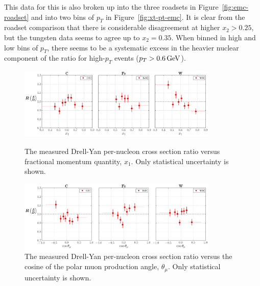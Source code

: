 This data for this is also broken up into the three roadsets in Figure~\ref{fig:emc-roadset} and into two bins of $p_T$ in Figure~\ref{fig:xt-pt-emc}. It is clear from the roadset comparison that there is considerable disagreement at higher $x_2>0.25$, but the tungsten data seems to agree up to $x_2=0.35$. When binned in high and low bins of $p_T$, there seems to be a systematic excess in the heavier nuclear component of the ratio for high-$p_T$ events ($p_T>\unit[0.6]{GeV}$).

\begin{figure}
	\centering
	\includegraphics[width=0.85\textwidth]{figures/results/xB-emc.png}
	\caption{The measured Drell-Yan per-nucleon cross section ratio versus fractional momentum quantity, $x_1$. Only statistical uncertainty is shown.}
	\label{fig:xB-emc}
	\vspace{1cm}
	\includegraphics[width=0.85\textwidth]{figures/results/costh-emc.png}
	\caption{The measured Drell-Yan per-nucleon cross section ratio versus the cosine of the polar muon production angle, $\theta_\mu$. Only statistical uncertainty is shown.}
	\label{fig:costh-emc}
\end{figure}
